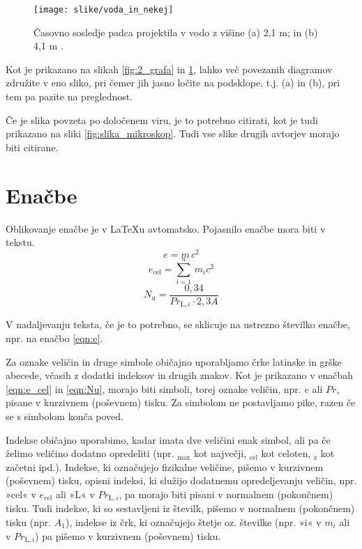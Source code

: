 \begin{figure}[ht!]
	\begin{centering}
		\texttt{[image: slike/voda\_in\_nekej]}
		\caption{Časovno sosledje padca projektila v vodo z višine (a) 2,1 m; 
		in (b) 
			4,1 m \cite{Loukides_2020}.} \label{fig:voda_in_nekej}
	\end{centering}
\end{figure}

Kot je prikazano na slikah \ref{fig:2_grafa} in \ref{fig:voda_in_nekej}, lahko 
več povezanih diagramov združite v eno sliko, pri čemer jih jasno ločite na 
podsklope, t.j. (a) in (b), pri tem pa pazite na preglednost.

Če je slika povzeta po določenem viru, je to potrebno citirati, kot je tudi 
prikazano na sliki \ref{fig:slika_mikroskop}. Tudi vse slike drugih avtorjev 
morajo biti citirane.

\section{Enačbe}\label{sec:enacbe}

Oblikovanje enačbe je v \LaTeX u avtomatsko. Pojasnilo enačbe mora biti v 
tekstu.
\begin{equation}\label{eqn:e}
	e = m\,c^2
\end{equation}
\begin{equation}\label{eqn:e_cel}
	e_{\text{cel}}=\sum_{i=1}^{n}\,m_{i}c^2
\end{equation}
\begin{equation}\label{eqn:Nu}
	N_{\text{u}} = \frac{0{,}34}{Pr_{\text{L},i}\cdot 2{,}3A}
\end{equation}

V nadaljevanju teksta, če je to potrebno, se sklicuje na ustrezno številko 
enačbe, npr. na enačbo \eqref{eqn:e}.

Za oznake veličin in druge simbole običajno uporabljamo črke latinske in grške 
abecede, včasih z dodatki indeksov in drugih znakov. Kot je prikazano v enačbah 
\eqref{eqn:e_cel} in \eqref{eqn:Nu}, morajo biti simboli, torej oznake veličin, 
npr. $e$ ali $Pr$, pisane v kurzivnem (poševnem) tisku. Za simbolom ne 
postavljamo pike, razen če se s simbolom konča poved.

Indekse običajno uporabimo, kadar imata dve veličini enak simbol, ali pa če 
želimo veličino dodatno opredeliti (npr. $_{\text{max}}$ kot največji, 
$_{\text{cel}}$ kot celoten, $_{\text{z}}$ kot začetni ipd.). Indekse, ki 
označujejo fizikalne veličine, pišemo v kurzivnem (poševnem) tisku, opisni 
indeksi, ki služijo dodatnemu opredeljevanju veličin, npr. »cel« v 
$e_{\text{cel}}$ ali »L« v $Pr_{\text{L},i}$, pa morajo biti pisani v normalnem 
(pokončnem) tisku. Tudi indekse, ki so sestavljeni iz številk, pišemo v 
normalnem (pokončnem) tisku (npr. $A_1$), indekse iz črk, ki označujejo štetje 
oz. številke (npr. »i« v $m_i$ ali v $Pr_{\text{L},i}$) pa pišemo v kurzivnem 
(poševnem) tisku.

